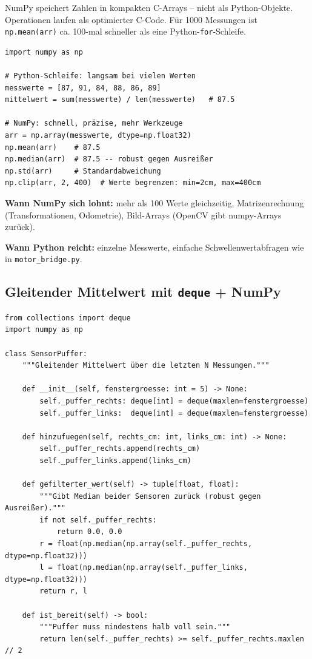 \begin{wissenBox}
NumPy speichert Zahlen in kompakten C-Arrays -- nicht als Python-Objekte.
Operationen laufen als optimierter C-Code.
Für 1000 Messungen ist \texttt{np.mean(arr)} ca. 100-mal schneller
als eine Python-\texttt{for}-Schleife.

\begin{lstlisting}
import numpy as np

# Python-Schleife: langsam bei vielen Werten
messwerte = [87, 91, 84, 88, 86, 89]
mittelwert = sum(messwerte) / len(messwerte)   # 87.5

# NumPy: schnell, präzise, mehr Werkzeuge
arr = np.array(messwerte, dtype=np.float32)
np.mean(arr)    # 87.5
np.median(arr)  # 87.5 -- robust gegen Ausreißer
np.std(arr)     # Standardabweichung
np.clip(arr, 2, 400)  # Werte begrenzen: min=2cm, max=400cm
\end{lstlisting}

\textbf{Wann NumPy sich lohnt:} mehr als 100 Werte gleichzeitig,
Matrizenrechnung (Transformationen, Odometrie),
Bild-Arrays (OpenCV gibt numpy-Arrays zurück).

\textbf{Wann Python reicht:} einzelne Messwerte,
einfache Schwellenwertabfragen wie in \texttt{motor\_bridge.py}.
\end{wissenBox}

\subsection{Gleitender Mittelwert mit \texttt{deque} + NumPy}

\begin{lstlisting}
from collections import deque
import numpy as np

class SensorPuffer:
    """Gleitender Mittelwert über die letzten N Messungen."""

    def __init__(self, fenstergroesse: int = 5) -> None:
        self._puffer_rechts: deque[int] = deque(maxlen=fenstergroesse)
        self._puffer_links:  deque[int] = deque(maxlen=fenstergroesse)

    def hinzufuegen(self, rechts_cm: int, links_cm: int) -> None:
        self._puffer_rechts.append(rechts_cm)
        self._puffer_links.append(links_cm)

    def gefilterter_wert(self) -> tuple[float, float]:
        """Gibt Median beider Sensoren zurück (robust gegen Ausreißer)."""
        if not self._puffer_rechts:
            return 0.0, 0.0
        r = float(np.median(np.array(self._puffer_rechts, dtype=np.float32)))
        l = float(np.median(np.array(self._puffer_links,  dtype=np.float32)))
        return r, l

    def ist_bereit(self) -> bool:
        """Puffer muss mindestens halb voll sein."""
        return len(self._puffer_rechts) >= self._puffer_rechts.maxlen // 2
\end{lstlisting}

